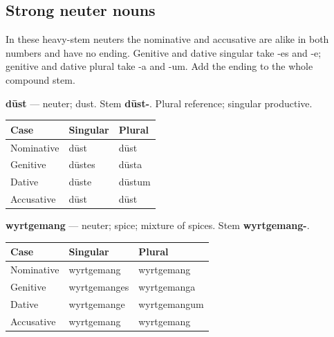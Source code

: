\subsection*{Strong neuter nouns}

In these heavy-stem neuters the nominative and accusative are alike in both numbers and have no ending. Genitive and dative singular take -es and -e; genitive and dative plural take -a and -um. Add the ending to the whole compound stem.

\textbf{dūst} — neuter; dust. Stem \textbf{dūst-}. Plural reference; singular productive.

\par\begingroup
\fontsize{10.5}{13.2}\selectfont
\setlength{\LTleft}{0pt}\setlength{\LTright}{\fill}
\noindent
\begin{tabular}{@{}>{\raggedright\arraybackslash}p{39.46mm}>{\raggedright\arraybackslash}p{39.46mm}>{\raggedright\arraybackslash}p{39.46mm}@{}}
\toprule
\textbf{Case} & \textbf{Singular} & \textbf{Plural} \\
\midrule
Nominative & dūst & dūst \\
Genitive & dūstes & dūsta \\
Dative & dūste & dūstum \\
Accusative & dūst & dūst \\
\bottomrule
\end{tabular}
\par\endgroup

\textbf{wyrtgemang} — neuter; spice; mixture of spices. Stem \textbf{wyrtgemang-}.

\par\begingroup
\fontsize{10.5}{13.2}\selectfont
\setlength{\LTleft}{0pt}\setlength{\LTright}{\fill}
\noindent
\begin{tabular}{@{}>{\raggedright\arraybackslash}p{34.82mm}>{\raggedright\arraybackslash}p{41.78mm}>{\raggedright\arraybackslash}p{41.78mm}@{}}
\toprule
\textbf{Case} & \textbf{Singular} & \textbf{Plural} \\
\midrule
Nominative & wyrtgemang & wyrtgemang \\
Genitive & wyrtgemanges & wyrtgemanga \\
Dative & wyrtgemange & wyrtgemangum \\
Accusative & wyrtgemang & wyrtgemang \\
\bottomrule
\end{tabular}
\par\endgroup

